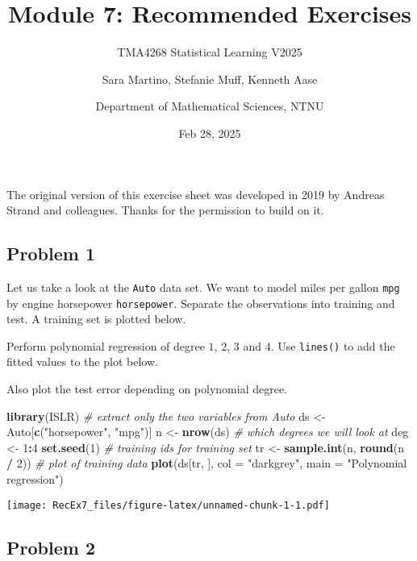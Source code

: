 \documentclass[
]{article}
\title{Module 7: Recommended Exercises}
\subtitle{TMA4268 Statistical Learning V2025}
\author{Sara Martino, Stefanie Muff, Kenneth Aase \and Department of
Mathematical Sciences, NTNU}
\date{Feb 28, 2025}
\newenvironment{Shaded}{\begin{snugshade}}{\end{snugshade}}
\newcommand{\AttributeTok}[1]{\textcolor[rgb]{0.13,0.29,0.53}{#1}}
\newcommand{\CommentTok}[1]{\textcolor[rgb]{0.56,0.35,0.01}{\textit{#1}}}
\newcommand{\DecValTok}[1]{\textcolor[rgb]{0.00,0.00,0.81}{#1}}
\newcommand{\FunctionTok}[1]{\textcolor[rgb]{0.13,0.29,0.53}{\textbf{#1}}}
\newcommand{\NormalTok}[1]{#1}
\newcommand{\OtherTok}[1]{\textcolor[rgb]{0.56,0.35,0.01}{#1}}
\newcommand{\SpecialCharTok}[1]{\textcolor[rgb]{0.81,0.36,0.00}{\textbf{#1}}}
\newcommand{\StringTok}[1]{\textcolor[rgb]{0.31,0.60,0.02}{#1}}
\begin{document}
\maketitle

The original version of this exercise sheet was developed in 2019 by
Andreas Strand and colleagues. Thanks for the permission to build on it.

\subsection{Problem 1}\label{problem-1}

Let us take a look at the \texttt{Auto} data set. We want to model miles
per gallon \texttt{mpg} by engine horsepower \texttt{horsepower}.
Separate the observations into training and test. A training set is
plotted below.

Perform polynomial regression of degree \(1\), \(2\), \(3\) and \(4\).
Use \texttt{lines()} to add the fitted values to the plot below.

Also plot the test error depending on polynomial degree.

\begin{Shaded}
\begin{Highlighting}[]
\FunctionTok{library}\NormalTok{(ISLR)}
\CommentTok{\# extract only the two variables from Auto}
\NormalTok{ds }\OtherTok{\textless{}{-}}\NormalTok{ Auto[}\FunctionTok{c}\NormalTok{(}\StringTok{"horsepower"}\NormalTok{, }\StringTok{"mpg"}\NormalTok{)]}
\NormalTok{n }\OtherTok{\textless{}{-}} \FunctionTok{nrow}\NormalTok{(ds)}
\CommentTok{\# which degrees we will look at}
\NormalTok{deg }\OtherTok{\textless{}{-}} \DecValTok{1}\SpecialCharTok{:}\DecValTok{4}
\FunctionTok{set.seed}\NormalTok{(}\DecValTok{1}\NormalTok{)}
\CommentTok{\# training ids for training set}
\NormalTok{tr }\OtherTok{\textless{}{-}} \FunctionTok{sample.int}\NormalTok{(n, }\FunctionTok{round}\NormalTok{(n }\SpecialCharTok{/} \DecValTok{2}\NormalTok{))}
\CommentTok{\# plot of training data}
\FunctionTok{plot}\NormalTok{(ds[tr, ], }\AttributeTok{col =} \StringTok{"darkgrey"}\NormalTok{, }\AttributeTok{main =} \StringTok{"Polynomial regression"}\NormalTok{)}
\end{Highlighting}
\end{Shaded}

\texttt{[image: RecEx7\_files/figure-latex/unnamed-chunk-1-1.pdf]}

\subsection{Problem 2}\label{problem-2}
\end{document}
